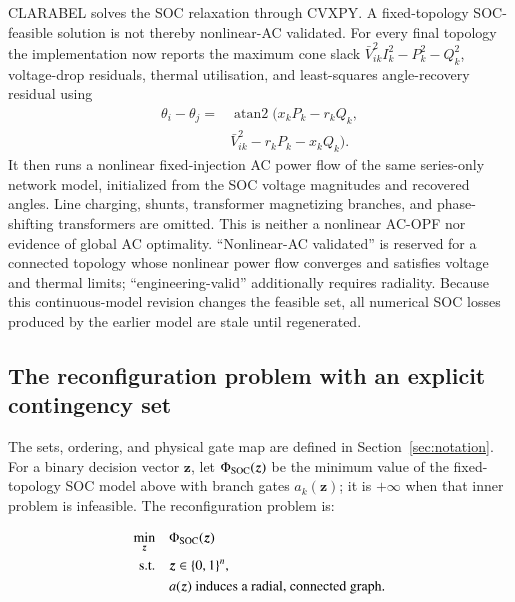 \documentclass[5p,twocolumn,number,sort&compress,nopreprintline]{elsarticle}
\begin{document}
CLARABEL solves the SOC relaxation through CVXPY\@. A fixed-topology
SOC-feasible solution is not thereby nonlinear-AC validated. For every final
topology the implementation now reports the maximum cone slack
$\bar V_{ik}^2I_k^2-P_k^2-Q_k^2$, voltage-drop residuals, thermal
utilisation, and least-squares angle-recovery residual using
\begin{equation}
\begin{aligned}
\theta_i-\theta_j={}&\operatorname{atan2}\!\bigl(
x_kP_k-r_kQ_k,\\
&\bar V_{ik}^2-r_kP_k-x_kQ_k\bigr).
\end{aligned}
\end{equation}
It then runs a nonlinear fixed-injection AC power flow of the same
series-only network model, initialized from the SOC voltage magnitudes
and recovered angles. Line charging, shunts, transformer magnetizing
branches, and phase-shifting transformers are omitted. This is neither
a nonlinear AC-OPF nor evidence of global AC optimality.
``Nonlinear-AC validated'' is reserved for a
connected topology whose nonlinear power flow converges and satisfies
voltage and thermal limits; ``engineering-valid'' additionally requires
radiality. Because this
continuous-model revision changes the feasible set, all numerical SOC
losses produced by the earlier model are stale until regenerated.

\subsection{The reconfiguration problem with an explicit contingency set}
\label{sec:problem}
The sets, ordering, and physical gate map are defined in
Section~\ref{sec:notation}. For a binary decision vector
$\boldsymbol z$, let $\Phi_{\rm SOC}(\boldsymbol z)$ be the minimum
value of the fixed-topology SOC model above with branch gates
$a_k(\boldsymbol z)$; it is $+\infty$ when that inner problem is
infeasible. The reconfiguration problem is:

{\small
\setlength{\mathindent}{0pt}
\begin{subequations}\label{eq:reconfig}
\begin{align}
\min_{\boldsymbol z}\quad
& \Phi_{\rm SOC}(\boldsymbol z)
  \label{eq:reconfig-obj}\\
\text{s.t.}\quad
& \boldsymbol z \in \{0,1\}^{n},
  \label{eq:reconfig-binary}\\
& a(\boldsymbol z)\text{ induces a radial, connected graph}.
  \label{eq:reconfig-rad}
\end{align}
\end{subequations}
}
\end{document}

